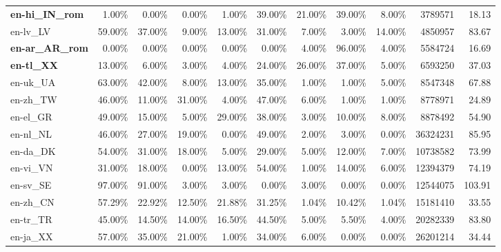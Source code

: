 \begin{table*}[hbt!]
{\begin{tabular}{l|rrrr|rrrr|rr}
            \textbf{en-hi\_IN\_rom} & 1.00\%  & 0.00\%  & 0.00\%  & 1.00\%  & 39.00\% & 21.00\% & 39.00\% & 8.00\%  & 3789571     & 18.13             \\
            en-lv\_LV               & 59.00\% & 37.00\% & 9.00\%  & 13.00\% & 31.00\% & 7.00\%  & 3.00\%  & 14.00\% & 4850957     & 83.67             \\
            \textbf{en-ar\_AR\_rom} & 0.00\%  & 0.00\%  & 0.00\%  & 0.00\%  & 0.00\%  & 4.00\%  & 96.00\% & 4.00\%  & 5584724     & 16.69             \\
            \textbf{en-tl\_XX}      & 13.00\% & 6.00\%  & 3.00\%  & 4.00\%  & 24.00\% & 26.00\% & 37.00\% & 5.00\%  & 6593250     & 37.03             \\
            en-uk\_UA               & 63.00\% & 42.00\% & 8.00\%  & 13.00\% & 35.00\% & 1.00\%  & 1.00\%  & 5.00\%  & 8547348     & 67.88             \\
            en-zh\_TW               & 46.00\% & 11.00\% & 31.00\% & 4.00\%  & 47.00\% & 6.00\%  & 1.00\%  & 1.00\%  & 8778971     & 24.89             \\
            en-el\_GR               & 49.00\% & 15.00\% & 5.00\%  & 29.00\% & 38.00\% & 3.00\%  & 10.00\% & 8.00\%  & 8878492     & 54.90             \\
            en-nl\_NL               & 46.00\% & 27.00\% & 19.00\% & 0.00\%  & 49.00\% & 2.00\%  & 3.00\%  & 0.00\%  & 36324231    & 85.95             \\
            en-da\_DK               & 54.00\% & 31.00\% & 18.00\% & 5.00\%  & 29.00\% & 5.00\%  & 12.00\% & 7.00\%  & 10738582    & 73.99             \\
            en-vi\_VN               & 31.00\% & 18.00\% & 0.00\%  & 13.00\% & 54.00\% & 1.00\%  & 14.00\% & 6.00\%  & 12394379    & 74.19             \\
            en-sv\_SE               & 97.00\% & 91.00\% & 3.00\%  & 3.00\%  & 0.00\%  & 3.00\%  & 0.00\%  & 0.00\%  & 12544075    & 103.91            \\
            en-zh\_CN               & 57.29\% & 22.92\% & 12.50\% & 21.88\% & 31.25\% & 1.04\%  & 10.42\% & 1.04\%  & 15181410    & 33.55             \\
            en-tr\_TR               & 45.00\% & 14.50\% & 14.00\% & 16.50\% & 44.50\% & 5.00\%  & 5.50\%  & 4.00\%  & 20282339    & 83.80             \\
            en-ja\_XX               & 57.00\% & 35.00\% & 21.00\% & 1.00\%  & 34.00\% & 6.00\%  & 0.00\%  & 0.00\%  & 26201214    & 34.44             \\

\end{tabular}}
\end{table*}
